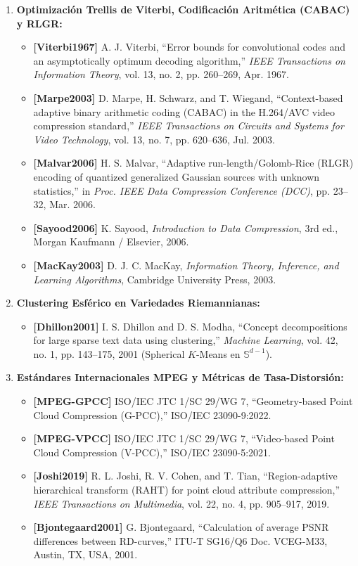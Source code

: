 \documentclass[11pt,a4paper]{article}
\begin{document}
\begin{enumerate}
  \item \textbf{Optimización Trellis de Viterbi, Codificación Aritmética (CABAC) y RLGR:}
  \begin{itemize}
    \item \textbf{[Viterbi1967]} A. J. Viterbi, ``Error bounds for convolutional codes and an asymptotically optimum decoding algorithm,'' \textit{IEEE Transactions on Information Theory}, vol. 13, no. 2, pp. 260--269, Apr. 1967.
    \item \textbf{[Marpe2003]} D. Marpe, H. Schwarz, and T. Wiegand, ``Context-based adaptive binary arithmetic coding (CABAC) in the H.264/AVC video compression standard,'' \textit{IEEE Transactions on Circuits and Systems for Video Technology}, vol. 13, no. 7, pp. 620--636, Jul. 2003.
    \item \textbf{[Malvar2006]} H. S. Malvar, ``Adaptive run-length/Golomb-Rice (RLGR) encoding of quantized generalized Gaussian sources with unknown statistics,'' in \textit{Proc. IEEE Data Compression Conference (DCC)}, pp. 23--32, Mar. 2006.
    \item \textbf{[Sayood2006]} K. Sayood, \textit{Introduction to Data Compression}, 3rd ed., Morgan Kaufmann / Elsevier, 2006.
    \item \textbf{[MacKay2003]} D. J. C. MacKay, \textit{Information Theory, Inference, and Learning Algorithms}, Cambridge University Press, 2003.
  \end{itemize}

  \item \textbf{Clustering Esférico en Variedades Riemannianas:}
  \begin{itemize}
    \item \textbf{[Dhillon2001]} I. S. Dhillon and D. S. Modha, ``Concept decompositions for large sparse text data using clustering,'' \textit{Machine Learning}, vol. 42, no. 1, pp. 143--175, 2001 (Spherical $K$-Means en $\mathbb{S}^{d-1}$).
  \end{itemize}

  \item \textbf{Estándares Internacionales MPEG y Métricas de Tasa-Distorsión:}
  \begin{itemize}
    \item \textbf{[MPEG-GPCC]} ISO/IEC JTC 1/SC 29/WG 7, ``Geometry-based Point Cloud Compression (G-PCC),'' ISO/IEC 23090-9:2022.
    \item \textbf{[MPEG-VPCC]} ISO/IEC JTC 1/SC 29/WG 7, ``Video-based Point Cloud Compression (V-PCC),'' ISO/IEC 23090-5:2021.
    \item \textbf{[Joshi2019]} R. L. Joshi, R. V. Cohen, and T. Tian, ``Region-adaptive hierarchical transform (RAHT) for point cloud attribute compression,'' \textit{IEEE Transactions on Multimedia}, vol. 22, no. 4, pp. 905--917, 2019.
    \item \textbf{[Bjontegaard2001]} G. Bjontegaard, ``Calculation of average PSNR differences between RD-curves,'' ITU-T SG16/Q6 Doc. VCEG-M33, Austin, TX, USA, 2001.
  \end{itemize}
\end{enumerate}
\end{document}
